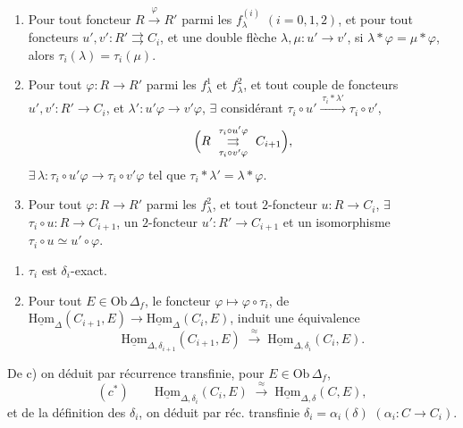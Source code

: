 \documentclass[11pt,a4paper]{article}
\begin{document}
\begin{enumerate}
  \item[$a_0$)] Pour tout foncteur $R \xrightarrow{\ \varphi\ } R'$ parmi les
    $f^{(i)}_\lambda$ $(i = 0,1,2)$, et pour tout  foncteurs
    $u', v' : R' \rightrightarrows C_i$, et une double flèche
    $\lambda, \mu : u' \to v'$, si $\lambda * \varphi = \mu * \varphi$, alors
    $\tau_i(\lambda) = \tau_i(\mu)$.
  \item[$a_1$)] Pour tout \struck{\ill{}} \add{$\varphi$} 
    $\varphi : R \to R'$ parmi les $f^1_\lambda$ et $f^2_\lambda$, et tout
    couple de \add{$\Delta$-}foncteurs $u', v' : R' \to C_i$, et
    $\lambda' : u'\varphi \to v'\varphi$, $\exists$ \struck{\ill{}} considérant
    $\tau_i \circ u' \xrightarrow{\ \tau_i * \lambda'\ } \tau_i \circ v'$,
    \[
      \Bigl( R \ \overset{\tau_i \circ u' \varphi}
      {\underset{\tau_i \circ v' \varphi}{\rightrightarrows}}\ C_{i+1} \Bigr),
    \]
    $\exists\, \lambda : \tau_i \circ u' \varphi \to \tau_i \circ v' \varphi$ tel
    que $\tau_i * \lambda' = \lambda * \varphi$.
  \item[$a_2$)] Pour tout $\varphi : R \to R'$ parmi les $f^2_\lambda$, et tout
    $2$-foncteur $u : R \to C_i$, $\exists$ \ill{}
    $\tau_i \circ u : R \to C_{i+1}$, un $2$-foncteur $u' : R' \to C_{i+1}$ et un
    isomorphisme $\tau_i \circ u \simeq u' \circ \varphi$.
\end{enumerate}

\begin{enumerate}
  \item[b)] $\tau_i$ est $\delta_i$-exact.
  \item[c)] Pour tout $E \in \mathrm{Ob}\,\Delta_f$, le foncteur
    $\varphi \mapsto \varphi \circ \tau_i$, de
    $\underline{\mathrm{Hom}}_{\Delta}(C_{i+1}, E) \to \underline{\mathrm{Hom}}_{\Delta}(C_i, E)$,
    induit une équivalence
    \[
      \underline{\mathrm{Hom}}_{\Delta,\delta_{i+1}}(C_{i+1}, E)
      \;\xrightarrow{\ \approx\ }\;
      \underline{\mathrm{Hom}}_{\Delta,\delta_i}(C_i, E).
    \]
\end{enumerate}


De c) on déduit par récurrence transfinie, pour $E \in \mathrm{Ob}\,\Delta_f$,
\[
  (c^{*}) \qquad
  \underline{\mathrm{Hom}}_{\Delta,\delta_i}(C_i, E)
  \;\xrightarrow{\ \approx\ }\;
  \underline{\mathrm{Hom}}_{\Delta,\delta}(C, E),
\]
et de la définition des $\delta_i$, on déduit par réc. transfinie
$\delta_i = \alpha_i(\delta)$ $(\alpha_i : C \to C_i)$.
\end{document}
